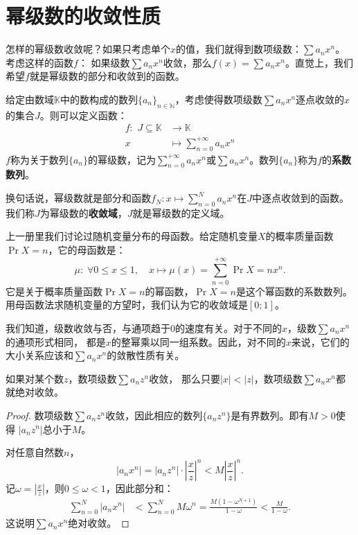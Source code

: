 \documentclass[12pt,UTF8]{ctexbook}
\begin{document}
\section{幂级数的收敛性质}

怎样的幂级数收敛呢？如果只考虑单个$x$的值，我们就得到数项级数：$\sum a_n x^n$。考虑这样的函数$f$：
如果级数$\sum a_n x^n$收敛，那么$f(x) = \sum a_n x^n$。直觉上，我们希望$f$就是幂级数的部分和收敛到的函数。

\begin{df}
    给定由数域$\mathbb{K}$中的数构成的数列$\{a_n\}_{n\in\mathbb{N}}$，考虑使得数项级数$\sum a_n x^n$逐点收敛的$x$的集合$J$。则可以定义函数：
    $$
    \begin{array}{rl}
        f: \,\, J\subseteq \mathbb{K} &\rightarrow \mathbb{K} \\
        x &\displaystyle \mapsto \sum_{n=0}^{+\infty} a_n x^n        
    \end{array}
    $$
    $f$称为关于数列$\{a_n\}$的幂级数，记为$\sum_{n=0}^{+\infty} a_n x^n$或$\sum a_n x^n$。数列$\{a_n\}$称为$f$的\textbf{系数数列}。
\end{df}
换句话说，幂级数就是部分和函数$f_N : x\mapsto \sum_{n=0}^{N} a_n x^n$在$J$中逐点收敛到的函数。
我们称$J$为幂级数的\textbf{收敛域}，$J$就是幂级数的定义域。

\begin{ex}
    上一册里我们讨论过随机变量分布的母函数。给定随机变量$X$的概率质量函数$\Pr{X=n}$，它的母函数是：
    $$ \mu: \; \forall 0\leqslant x\leqslant 1, \quad x\mapsto \mu(x) = \sum_{n=0}^{+\infty} \Pr{X=n} x^n. $$
    它是关于概率质量函数$\Pr{X=n}$的幂函数，$\Pr{X=n}$是这个幂函数的系数数列。用母函数法求随机变量的方望时，我们认为它的收敛域是$[0;1]$。
\end{ex}

我们知道，级数收敛与否，与通项趋于$0$的速度有关。对于不同的$x$，级数$\sum a_n x^n$的通项形式相同，
都是$x$的整幂乘以同一组系数。因此，对不同的$x$来说，它们的大小关系应该和$\sum a_n x^n$的敛散性质有关。

\begin{tm}\label{tm:1-1-0}
    如果对某个数$z$，数项级数$\sum a_n z^n$收敛，
    那么只要$|x|<|z|$，数项级数$\sum a_n x^n$都就绝对收敛。
\end{tm}

\begin{proof}
    数项级数$\sum a_n z^n$收敛，因此相应的数列$\{a_n z^n\}$是有界数列。即有$M>0$使得
    $|a_n z^n|$总小于$M$。

    对任意自然数$n$，
    $$ |a_n x^n| = |a_n z^n| \cdot \left|\frac{x}{z}\right|^n < M \left|\frac{x}{z}\right|^n. $$
    记$\displaystyle \omega = \left|\frac{x}{z}\right|$，则$0\leqslant \omega<1$，因此部分和：
    \begin{align*}
        \sum_{n=0}^N |a_n x^n| &< \sum_{n=0}^N M \omega^n = \frac{M(1 - \omega^{N+1})}{1 - \omega} < \frac{M}{1 - \omega}.
    \end{align*}
    这说明$\sum a_n x^n$绝对收敛。

\end{proof}
\end{document}
